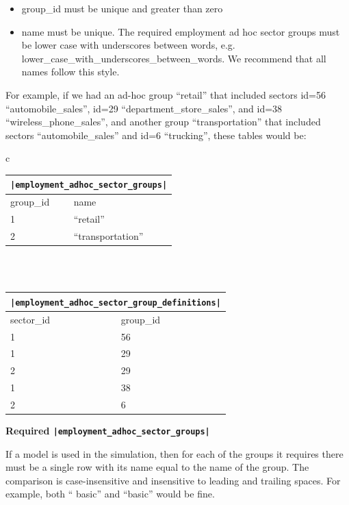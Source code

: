 \begin{itemize}
\tight
\item group_id must be unique and greater than zero
\item name must be unique. The required employment ad hoc sector groups must be
lower case with underscores between words, e.g.
lower_case_with_underscores_between_words. We recommend that all names follow
this style.
\end{itemize}

For example, if we had an ad-hoc group ``retail'' that included sectors id=56
``automobile_sales'', id=29 ``department_store_sales'', and id=38
``wireless_phone_sales'', and another group ``transportation'' that included
sectors ``automobile_sales'' and id=6 ``trucking'', these tables would be:

\begin{center}
\begin{tabular}{c}

\begin{tabular}{|l|l|}
\multicolumn{2}{c}{\tt|employment_adhoc_sector_groups|}\\
\hline
group_id & name \\
\hline
1 &``retail'' \\
\hline
2 &``transportation'' \\
\hline
\end{tabular}

\\ \\

\begin{tabular}{|l|l|}
\multicolumn{2}{c}{\tt|employment_adhoc_sector_group_definitions|}\\
\hline
sector_id & group_id \\
\hline
1 &56 \\
\hline
1 &29 \\
\hline
2 &29 \\
\hline
1 &38 \\
\hline
2 &6 \\
\hline
\end{tabular}

\end{tabular}
\end{center}
\textbf{Required \tt|employment_adhoc_sector_groups|}

If a model \modelsindex is used in the simulation, then for each of the groups it requires
there must be a single row with its name equal to the name of the group. The
comparison is case-insensitive and insensitive to leading and trailing spaces.
For example, both `` basic'' and ``basic'' would be fine.

